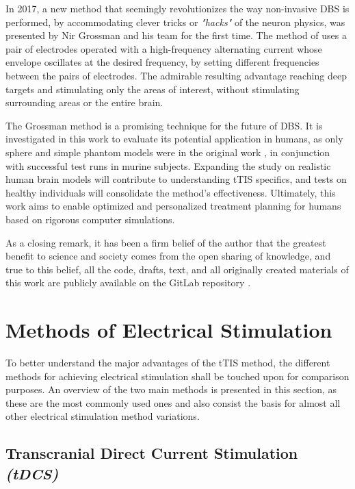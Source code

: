 In 2017, a new method that seemingly revolutionizes the way non-invasive \gls{DBS} is performed, by accommodating clever tricks or \textit{"hacks"} of the neuron physics, was presented by Nir Grossman and his team \cite{Grossman2017} for the first time. The method of  uses a pair of electrodes operated with a high-frequency alternating current whose envelope oscillates at the desired frequency, by setting different frequencies between the pairs of electrodes. The admirable resulting advantage reaching deep targets and stimulating only the areas of interest, without stimulating surrounding areas or the entire brain.

The Grossman method is a promising technique for the future of \gls{DBS}. It is investigated in this work to evaluate its potential application in humans, as only sphere and simple phantom models were in the original work \cite{Grossman2017}, in conjunction with successful test runs in murine subjects. Expanding the study on realistic human brain models will contribute to understanding \gls{tTIS} specifics, and tests on healthy individuals will consolidate the method's effectiveness. Ultimately, this work aims to enable optimized and personalized treatment planning for humans based on rigorous computer simulations. 

As a closing remark, it has been a firm belief of the author that the greatest benefit to science and society comes from the open sharing of knowledge, and true to this belief, all the code, drafts, text, and all originally created materials of this work are publicly available on the GitLab repository \cite{thesis_repo}.

\section{Methods of Electrical Stimulation}

To better understand the major advantages of the \gls{tTIS} method, the different methods for achieving electrical stimulation shall be touched upon for comparison purposes. An overview of the two main methods is presented in this section, as these are the most commonly used ones and also consist the basis for almost all other electrical stimulation method variations.

\subsection{Transcranial Direct Current Stimulation \textit{(tDCS)}}

